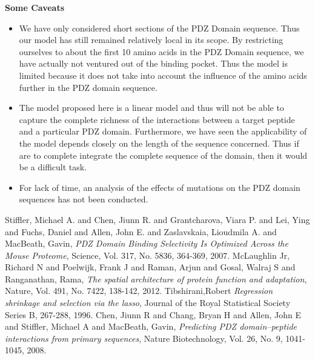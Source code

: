 \documentclass[a4paper, 12pt]{article}
\begin{document}
\textbf{Some Caveats}

\begin{itemize}
\item 
We have only considered short sections of the PDZ Domain sequence. Thus our model has still remained relatively local in its scope. By restricting ourselves to about the first 10 amino acids in the PDZ Domain sequence, we have actually not ventured out of the binding pocket. Thus the model is limited because it does not take into account the influence of the amino acids further in the PDZ domain sequence. 

\item 
The model proposed here is a linear model and thus will not be able to capture the complete richness of the interactions between a target peptide and a particular PDZ domain. Furthermore, we have seen the applicability of the model depends closely on the length of the sequence concerned. Thus if are to complete integrate the complete sequence of the domain, then it would be a difficult task. 

\item 
For lack of time, an analysis of the effects of mutations on the PDZ domain sequences has not been conducted. 
\end{itemize}

\newpage
\begin{thebibliography}{}
Stiffler, Michael A. and Chen, Jiunn R. and Grantcharova, Viara P. and Lei, Ying and Fuchs, Daniel and Allen, John E. and Zaslavskaia, Lioudmila A. and MacBeath, Gavin, \textit{PDZ Domain Binding Selectivity Is Optimized Across the Mouse Proteome}, Science, Vol. 317, No. 5836, 364-369, 2007.
McLaughlin Jr, Richard N and Poelwijk, Frank J and Raman, Arjun and Gosal, Walraj S and Ranganathan, Rama, \textit{The spatial architecture of protein function and adaptation}, Nature, Vol. 491, No. 7422, 138-142, 2012.
 Tibshirani,Robert \textit{Regression shrinkage and selection via the lasso}, Journal of the Royal Statistical Society Series B, 267-288, 1996.
Chen, Jiunn R and Chang, Bryan H and Allen, John E and Stiffler, Michael A and MacBeath, Gavin, \textit{Predicting PDZ domain--peptide interactions from primary sequences}, Nature Biotechnology, Vol. 26, No. 9, 1041-1045, 2008.
\end{thebibliography}
\end{document}
